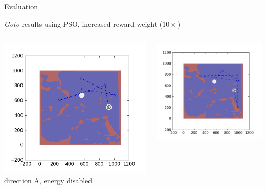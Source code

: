 \documentclass[9pt]{beamer}
\begin{document}
\begin{frame}{Evaluation}
\begin{block}{\textit{Goto} results using PSO, increased reward weight ($10\times$)}
\begin{columns}
\begin{column}{0.25\textwidth}
\begin{center}
                    \includegraphics[width=\textwidth,trim={2cm 2cm 2cm 2cm},clip]{img/EXP3RG_PathBa_-1_-1_0_0d01.png}
                    \newline
                    \tiny{direction A, energy disabled}
                \end{center}
            \end{column}
            \begin{column}{0.25\textwidth}
                \begin{center}
                    \includegraphics[width=\textwidth,trim={2cm 2cm 2cm 2cm},clip]{img/EXP3RG_PathBa_-1_-1_-1_0d01.png}

\end{center}
\end{column}
\end{columns}
\end{block}
\end{frame}
\end{document}
